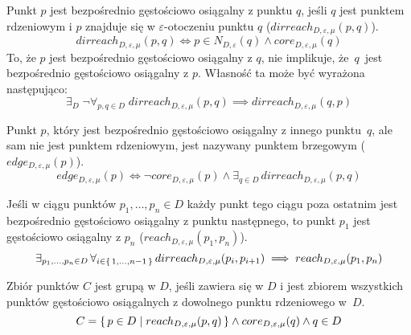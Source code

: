 \newline
Punkt $ p $ jest bezpośrednio gęstościowo osiągalny z punktu $ q $, jeśli $ q $ jest punktem rdzeniowym i $ p $ znajduje się w $ \varepsilon $-otoczeniu punktu $ q $ ($ dirreach_{D,\varepsilon,\mu}(p, q) $).
\begin{equation} \label{direct-reachability}
	dirreach_{D,\varepsilon,\mu}(p, q) \iff p \in N_{D,\varepsilon}(q) \land core_{D,\varepsilon,\mu}(q)
\end{equation}
To, że $ p $ jest bezpośrednio gęstościowo osiągalny z $ q $, nie implikuje, \mbox{że $ q $ jest} bezpośrednio gęstościowo osiągalny z $ p $. Własność ta może być wyrażona następująco:
\begin{equation} \label{direct-reachability-asymmetry}
	\exists_D\;\neg\forall_{p,q\in D}\;dirreach_{D,\varepsilon,\mu}(p, q) \implies dirreach_{D,\varepsilon,\mu}(q, p)
\end{equation}

\newline
Punkt $ p $, który jest bezpośrednio gęstościowo osiągalny z innego \mbox{punktu $ q $}, ale sam nie jest punktem rdzeniowym, jest nazywany punktem brzegowym ($ edge_{D,\varepsilon,\mu}(p) $).
\begin{equation}\label{edge-point}
	edge_{D,\varepsilon,\mu}(p) \iff \neg core_{D,\varepsilon,\mu}(p) \land \exists_{q\in D}\, dirreach_{D,\varepsilon,\mu}(p,q)
\end{equation}

\newline
Jeśli w ciągu punktów $ p_1,\dots,p_n \in D $ każdy punkt tego ciągu poza ostatnim jest bezpośrednio gęstościowo osiągalny z punktu następnego, to punkt $ p_1 $ jest gęstościowo osiągalny z $ p_n $ ($ reach_{D,\varepsilon,\mu}(p_1, p_n) $).
\begin{equation}
	\exists_{p_1,\dots,p_n\in D}\,\forall_{i\in\set{1,\dots,n-1}}\,dirreach_{D,\varepsilon,\mu}(p_i, p_{i+1}) \implies reach_{D,\varepsilon,\mu}(p_1, p_n)
\end{equation}



\newline
Zbiór punktów $ C $ jest grupą w $ D $, jeśli zawiera się w $ D $ i jest zbiorem wszystkich punktów gęstościowo osiągalnych z dowolnego punktu rdzeniowego \mbox{w $ D $}. 
\begin{equation}\label{eq:cluster-def}
C = \set{p \in D | reach_{D,\varepsilon,\mu}(p, q)} \land core_{D,\varepsilon,\mu}(q) \land q \in D
\end{equation}

